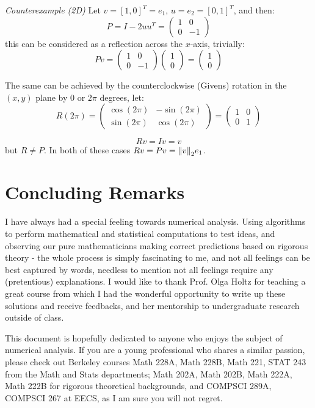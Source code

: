 \documentclass[12pt]{article} %
\newcommand{\1}[1]{\mathds{1}\left[#1\right]}
\begin{document}
\emph{Counterexample (2D)}
Let $v=[1,0]^T=e_1$, $u = e_2 = [0,1]^T$, and then:
$$
	P = I-2uu^T =
	\begin{pmatrix}
		1 & 0\\
		0 & -1
	\end{pmatrix}
$$ this can be considered as a reflection across the $x$-axis, trivially:
$$
	Pv = \begin{pmatrix}
		1 & 0\\
		0 & -1
	\end{pmatrix}\begin{pmatrix}1\\0 \end{pmatrix}=
	\begin{pmatrix}1\\0 \end{pmatrix}
$$

The same can be achieved by the counterclockwise (Givens) rotation in the $(x,y)$ plane by $0$ or $2\pi$ degrees, let:
$$
	R(2\pi) = \begin{pmatrix}
		\cos(2\pi) & -\sin(2\pi)\\
		\sin(2\pi) & \cos(2\pi)
	\end{pmatrix} =
	\begin{pmatrix}
		1 & 0\\
		0 & 1
	\end{pmatrix}
$$

$$
	Rv = Iv = v
$$ but $R\neq P$. In both of these cases $Rv=Pv = \norm{v}_2e_1$.

\section{Concluding Remarks}

\hspace{3ex} I have always had a special feeling towards numerical analysis. Using algorithms to perform mathematical and statistical computations to test ideas, and observing our pure mathematicians making correct predictions based on rigorous theory - the whole process is simply fascinating to me, and not all feelings can be best captured by words, needless to mention not all feelings require any (pretentious) explanations. I would like to thank Prof. Olga Holtz for teaching a great course from which I had the wonderful opportunity to write up these solutions and receive feedbacks, and her mentorship to undergraduate research outside of class. 

This document is hopefully dedicated to anyone who enjoys the subject of numerical analysis. If you are a young professional who shares a similar passion, please check out Berkeley courses Math 228A, Math 228B, Math 221, STAT 243 from the Math and Stats departments; Math 202A, Math 202B, Math 222A, Math 222B for rigorous theoretical backgrounds, and COMPSCI 289A, COMPSCI 267 at EECS, as I am sure you will not regret. 
\end{document}
